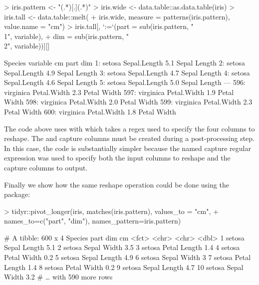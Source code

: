 \begin{Schunk}
\begin{Sinput}
> iris.pattern <- "(.*)[.](.*)"
> iris.wide <- data.table::as.data.table(iris)
> iris.tall <- data.table::melt(
+   iris.wide, measure = patterns(iris.pattern), value.name = "cm")
> iris.tall[, `:=`(part = sub(iris.pattern, "\\1", variable),
+                  dim  = sub(iris.pattern, "\\2", variable))][]
\end{Sinput}
\begin{Soutput}
       Species     variable  cm  part    dim
  1:    setosa Sepal.Length 5.1 Sepal Length
  2:    setosa Sepal.Length 4.9 Sepal Length
  3:    setosa Sepal.Length 4.7 Sepal Length
  4:    setosa Sepal.Length 4.6 Sepal Length
  5:    setosa Sepal.Length 5.0 Sepal Length
 ---                                        
596: virginica  Petal.Width 2.3 Petal  Width
597: virginica  Petal.Width 1.9 Petal  Width
598: virginica  Petal.Width 2.0 Petal  Width
599: virginica  Petal.Width 2.3 Petal  Width
600: virginica  Petal.Width 1.8 Petal  Width
\end{Soutput}
\end{Schunk}

The code above uses  with  which
takes a regex used to specify the four columns to reshape. The 
and  capture columns must be created during a post-processing
step. In this case, the  code is substantially simpler because
the named capture regular expression was used to specify both the
input columns to reshape and the capture columns to output.

Finally we show how the same reshape operation could be done using the
 package:

\begin{Schunk}
\begin{Sinput}
> tidyr::pivot_longer(iris, matches(iris.pattern), values_to = "cm",
+   names_to=c("part", "dim"), names_pattern=iris.pattern)
\end{Sinput}
\begin{Soutput}
# A tibble: 600 x 4
   Species part  dim       cm
   <fct>   <chr> <chr>  <dbl>
 1 setosa  Sepal Length   5.1
 2 setosa  Sepal Width    3.5
 3 setosa  Petal Length   1.4
 4 setosa  Petal Width    0.2
 5 setosa  Sepal Length   4.9
 6 setosa  Sepal Width    3  
 7 setosa  Petal Length   1.4
 8 setosa  Petal Width    0.2
 9 setosa  Sepal Length   4.7
10 setosa  Sepal Width    3.2
# … with 590 more rows
\end{Soutput}
\end{Schunk}

